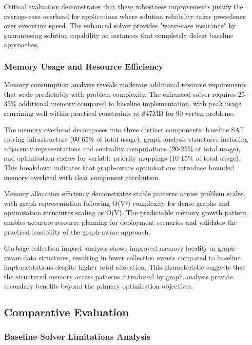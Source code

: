Critical evaluation demonstrates that these robustness improvements justify the average-case overhead for applications where solution reliability takes precedence over execution speed. The enhanced solver provides "worst-case insurance" by guaranteeing solution capability on instances that completely defeat baseline approaches.

\subsubsection{Memory Usage and Resource Efficiency}

Memory consumption analysis reveals moderate additional resource requirements that scale predictably with problem complexity. The enhanced solver requires 25-35\% additional memory compared to baseline implementation, with peak usage remaining well within practical constraints at 847MB for 90-vertex problems.

The memory overhead decomposes into three distinct components: baseline SAT solving infrastructure (60-65\% of total usage), graph analysis structures including adjacency representations and centrality computations (20-25\% of total usage), and optimisation caches for variable priority mappings (10-15\% of total usage). This breakdown indicates that graph-aware optimisations introduce bounded memory overhead with clear component attribution.

Memory allocation efficiency demonstrates stable patterns across problem scales, with graph representation following O(V²) complexity for dense graphs and optimisation structures scaling as O(V). The predictable memory growth pattern enables accurate resource planning for deployment scenarios and validates the practical feasibility of the graph-aware approach.

Garbage collection impact analysis shows improved memory locality in graph-aware data structures, resulting in fewer collection events compared to baseline implementations despite higher total allocation. This characteristic suggests that the structured memory access patterns introduced by graph analysis provide secondary benefits beyond the primary optimisation objectives.

\subsection{Comparative Evaluation}

\subsubsection{Baseline Solver Limitations Analysis}

